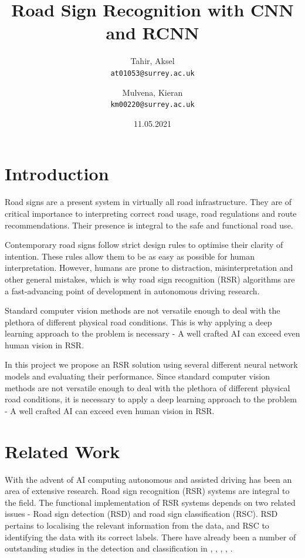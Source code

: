 \documentclass[12pt, landscape]{article}
\title{Road Sign Recognition with CNN and RCNN}
\author{
  Tahir, Aksel\\
  \texttt{at01053@surrey.ac.uk}
  \and
  Mulvena, Kieran\\
  \texttt{km00220@surrey.ac.uk}
}
\date{11.05.2021}
\begin{document}
\maketitle

\begin{multicols}{3}
\section{Introduction}
Road signs are a present system in virtually all road infrastructure. They are
of critical importance to interpreting correct road usage, road regulations and
route recommendations. Their presence is integral to the safe and functional
road use.

Contemporary road signs follow strict design rules to optimise their clarity of
intention. These rules allow them to be as easy as possible for human
interpretation. However, humans are prone to distraction, misinterpretation and
other general mistakes, which is why road sign recognition (RSR) algorithms are
a fast-advancing point of development in autonomous driving research.

Standard computer vision methods are not versatile enough to deal with the
plethora of different physical road conditions. This is why applying a deep
learning approach to the problem is necessary - A well crafted AI can exceed
even human vision in RSR.

In this project we propose an RSR solution using several different neural
network models and evaluating their performance. Since standard computer vision
methods are not versatile enough to deal with the plethora of different physical
road conditions, it is necessary to apply a deep learning approach to the
problem - A well crafted AI can exceed even human vision in RSR.

\section{Related Work}
With the advent of AI computing autonomous and assisted driving has been an area
of extensive research. Road sign recognition (RSR) systems are integral to the
field. The functional implementation of RSR systems depends on two related
issues - Road sign detection (RSD) and road sign classification (RSC). RSD
pertains to localising the relevant information from the data, and RSC to
identifying the data with its correct labels. There have already been a number
of outstanding studies in the detection and classification in
\citep{Classification1}, \citep{Classification2}, \citep{Classification3},
\citep{Classification4}, \citep{Classification5}.


\end{multicols}
\end{document}
